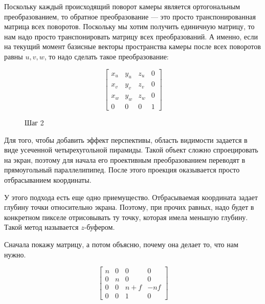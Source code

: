 \documentclass{article}
\begin{document}

Поскольку каждый происходящий поворот камеры является ортогональным преобразованием, то обратное преобразование --- это просто транспонированная матрица всех поворотов. Поскольку мы хотим получить единичную матрицу, то нам надо просто транспонировать матрицу всех преобразований. А именно, если на текущий момент базисные векторы пространства камеры после всех поворотов равны $u, v, w$, то надо сделать такое преобразование:

$$
\begin{bmatrix}
x_u & y_u & z_u & 0 \\
x_v & y_v & z_v & 0 \\
x_w & y_w & z_w & 0 \\
0 & 0 & 0 & 1
\end{bmatrix}
$$

\begin{center}
\begin{figure}[H]
\caption{Шаг 2}
\label{ris:image}
\end{figure}
\end{center}


Для того, чтобы добавить эффект перспективы, область видимости задается в виде усеченной четырехугольной пирамиды. Такой объект сложно спроецировать на экран, поэтому для начала его проективным преобразованием переводят в прямоугольный параллелипипед. После этого проекция оказывается просто отбрасыванием координаты.

У этого подхода есть еще одно приемущество. Отбрасываемая координата задает глубину точки относительно экрана. Поэтому, при прочих равных, надо будет в конкретном пикселе отрисовывать ту точку, которая имела меньшую глубину. Такой метод называется $z$-буфером.

Сначала покажу матрицу, а потом объясню, почему она делает то, что нам  нужно.

$$
\begin{bmatrix}
n & 0 & 0 & 0 \\
0 & n & 0 & 0 \\
0 & 0 & n + f & -nf \\
0 & 0 & 1 & 0
\end{bmatrix}
$$
\end{document}
